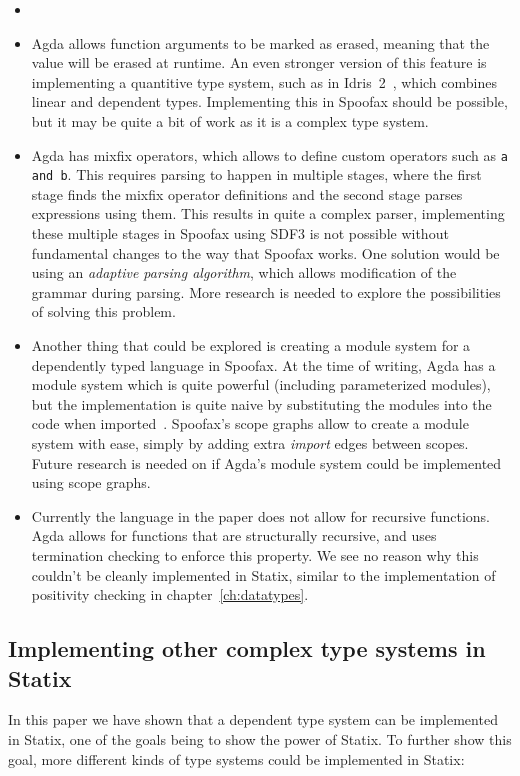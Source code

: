 \begin{itemize}
	\item {}
	\item Agda allows function arguments to be marked as erased, meaning that the value will be erased at runtime. An even stronger version of this feature is implementing a quantitive type system, such as in Idris~2~\cite{idris2}, which combines linear and dependent types. Implementing this in Spoofax should be possible, but it may be quite a bit of work as it is a complex type system.
	\item Agda has mixfix operators, which allows to define custom operators such as \verb|a and b|. This requires parsing to happen in multiple stages, where the first stage finds the mixfix operator definitions and the second stage parses expressions using them. This results in quite a complex parser, implementing these multiple stages in Spoofax using SDF3 is not possible without fundamental changes to the way that Spoofax works. One solution would be using an \emph{adaptive parsing algorithm}, which allows modification of the grammar during parsing. More research is needed to explore the possibilities of solving this problem.
	\item Another thing that could be explored is creating a module system for a dependently typed language in Spoofax. At the time of writing, Agda has a module system which is quite powerful (including parameterized modules), but the implementation is quite naive by substituting the modules into the code when imported~\cite[Modules]{agda}. Spoofax's scope graphs allow to create a module system with ease, simply by adding extra \emph{import} edges between scopes. Future research is needed on if Agda's module system could be implemented using scope graphs.
	\item Currently the language in the paper does not allow for recursive functions. Agda allows for functions that are structurally recursive, and uses termination checking to enforce this property. We see no reason why this couldn't be cleanly implemented in Statix, similar to the implementation of positivity checking in chapter~\ref{ch:datatypes}.
\end{itemize}

\subsection*{Implementing other complex type systems in Statix}

In this paper we have shown that a dependent type system can be implemented in Statix, one of the goals being to show the power of Statix. To further show this goal, more different kinds of type systems could be implemented in Statix:

